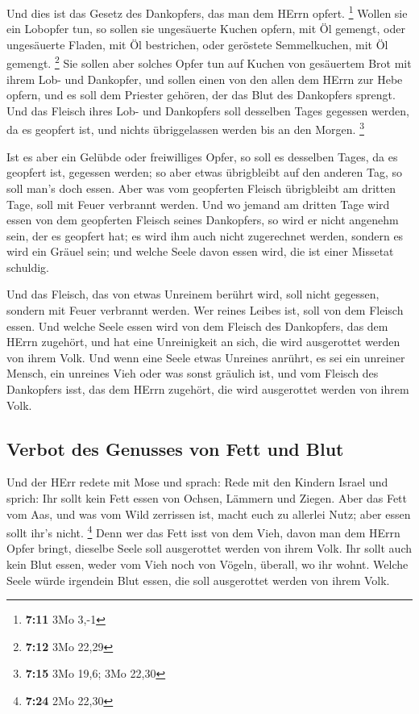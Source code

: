  Und dies ist das Gesetz des Dankopfers, das man dem
HErrn opfert. \footnote{\textbf{7:11} 3Mo 3,-1}  Wollen
sie ein Lobopfer tun, so sollen sie ungesäuerte Kuchen opfern, mit Öl
gemengt, oder ungesäuerte Fladen, mit Öl bestrichen, oder geröstete
Semmelkuchen, mit Öl gemengt. \footnote{\textbf{7:12} 3Mo 22,29}
 Sie sollen aber solches Opfer tun auf Kuchen von
gesäuertem Brot mit ihrem Lob- und Dankopfer,  und sollen
einen von den allen dem HErrn zur Hebe opfern, und es soll dem Priester
gehören, der das Blut des Dankopfers sprengt.  Und das
Fleisch ihres Lob- und Dankopfers soll desselben Tages gegessen werden,
da es geopfert ist, und nichts übriggelassen werden bis an den Morgen.
\footnote{\textbf{7:15} 3Mo 19,6; 3Mo 22,30}

 Ist es aber ein Gelübde oder freiwilliges Opfer, so soll
es desselben Tages, da es geopfert ist, gegessen werden; so aber etwas
übrigbleibt auf den anderen Tag, so soll man's doch essen.
 Aber was vom geopferten Fleisch übrigbleibt am dritten
Tage, soll mit Feuer verbrannt werden.  Und wo jemand am
dritten Tage wird essen von dem geopferten Fleisch seines Dankopfers, so
wird er nicht angenehm sein, der es geopfert hat; es wird ihm auch nicht
zugerechnet werden, sondern es wird ein Gräuel sein; und welche Seele
davon essen wird, die ist einer Missetat schuldig.

 Und das Fleisch, das von etwas Unreinem berührt wird,
soll nicht gegessen, sondern mit Feuer verbrannt werden. Wer reines
Leibes ist, soll von dem Fleisch essen.  Und welche Seele
essen wird von dem Fleisch des Dankopfers, das dem HErrn zugehört, und
hat eine Unreinigkeit an sich, die wird ausgerottet werden von ihrem
Volk.  Und wenn eine Seele etwas Unreines anrührt, es sei
ein unreiner Mensch, ein unreines Vieh oder was sonst gräulich ist, und
vom Fleisch des Dankopfers isst, das dem HErrn zugehört, die wird
ausgerottet werden von ihrem Volk.

\hypertarget{verbot-des-genusses-von-fett-und-blut}{%
\subsection{Verbot des Genusses von Fett und
Blut}\label{verbot-des-genusses-von-fett-und-blut}}

 Und der HErr redete mit Mose und sprach: 
Rede mit den Kindern Israel und sprich: Ihr sollt kein Fett essen von
Ochsen, Lämmern und Ziegen.  Aber das Fett vom Aas, und
was vom Wild zerrissen ist, macht euch zu allerlei Nutz; aber essen
sollt ihr's nicht. \footnote{\textbf{7:24} 2Mo 22,30} 
Denn wer das Fett isst von dem Vieh, davon man dem HErrn Opfer bringt,
dieselbe Seele soll ausgerottet werden von ihrem Volk. 
Ihr sollt auch kein Blut essen, weder vom Vieh noch von Vögeln, überall,
wo ihr wohnt.  Welche Seele würde irgendein Blut essen,
die soll ausgerottet werden von ihrem Volk.

